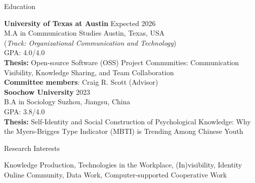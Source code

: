 \documentclass[
	11pt, %
]{resume} %
\begin{document}

\begin{rSection}{Education}
	
	\textbf{University of Texas at Austin} \hfill Expected 2026\\
	M.A in Communication Studies \hfill Austin, Texas, USA \\
	(\textit{Track: Organizational Communication and Technology}) \smallskip \\
	GPA: 4.0/4.0\\
    \textbf{Thesis:} Open-source Software (OSS) Project Communities: Communication Visibility, Knowledge Sharing, and Team Collaboration\\
    \textbf{Committee members}: Craig R. Scott (Advisor)\\

    \textbf{Soochow University} \hfill 2023 \\ 
	B.A in Sociology \hfill Suzhou, Jiangsu, China \\
	GPA: 3.8/4.0\\
    \textbf{Thesis:} Self-Identity and Social Construction of Psychological Knowledge: Why the Myers-Brigges Type Indicator (MBTI) is Trending Among Chinese Youth\\
	
\end{rSection}

\begin{rSection}{Research Interests}

Knowledge Production, Technologies in the Workplace, (In)visibility, Identity\\
Online Community, Data Work, Computer-supported Cooperative Work\\

\end{rSection}

\end{document}
